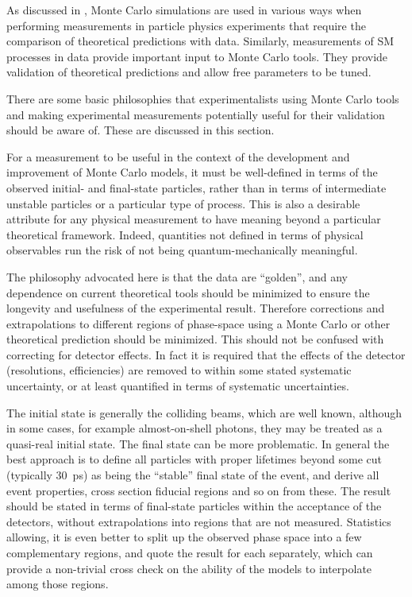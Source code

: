 As discussed in , Monte Carlo simulations are used in
various ways when performing measurements in particle physics experiments that require
the comparison of theoretical predictions with data.  Similarly, measurements of SM
processes in data provide important input to Monte Carlo tools. They provide validation
of theoretical predictions and allow free parameters to be tuned.

There are some basic philosophies that experimentalists using Monte Carlo tools
and making experimental measurements potentially useful for their
validation should be aware of.  These are discussed in this section.



\label{sec:mcfriendlyobs}

For a measurement to be useful in the context of the development and
improvement of Monte Carlo models, it must be well-defined in terms of
the observed initial- and final-state particles, rather than in terms of
intermediate unstable particles or a particular type of process.
This is also a desirable attribute for any physical measurement to have
meaning beyond a particular theoretical framework. Indeed, quantities
not defined in terms of physical observables run the risk of not being
quantum-mechanically meaningful.


The philosophy advocated here is that the data are ``golden'', and any
dependence on current theoretical tools should be minimized to ensure
the longevity and usefulness of the experimental result. Therefore
corrections and extrapolations to different regions of phase-space using
a Monte Carlo or other theoretical prediction should be minimized. This
should not be confused with correcting for detector effects. In fact it
is required that the effects of the detector (resolutions, efficiencies)
are removed to within some stated systematic uncertainty, or at least
quantified in terms of systematic uncertainties.

The initial state is generally the colliding beams, which are well
known, although in some cases, for example almost-on-shell photons, they
may be treated as a quasi-real initial state.  The final state can be
more problematic. In general the best approach is to define all
particles with proper lifetimes beyond some cut~\cite{Buttar:2008jx}
(typically 30~ps) as being the ``stable'' final state of the event, and
derive all event properties, cross section fiducial regions and so on
from these. The result should be stated in terms of final-state
particles within the acceptance of the detectors, without extrapolations
into regions that are not measured. Statistics allowing, it is even
better to split up the observed phase space into a few complementary
regions, and quote the result for each separately, which can provide a
non-trivial cross check on the ability of the models to interpolate
among those regions.

